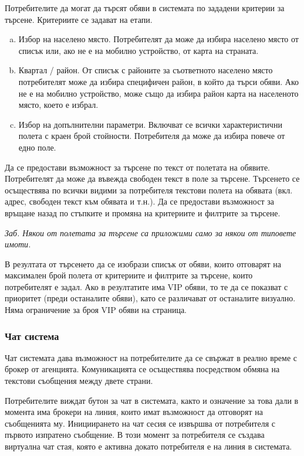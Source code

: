 \documentclass[a4paper]{article}
\begin{document}
Потребителите да могат да търсят обяви в системата по зададени критерии за търсене. Критериите се задават на етапи.
\begin{enumerate}[a) ]
\item Избор на населено място. Потребителят да може да избира населено място от списък  или, ако не е на мобилно устройство, от карта на страната. 
\item Квартал / район. От списък с районите за съответното населено място потребителят може да избира специфичен район, в който да търси обяви. Ако не е на мобилно устройство, може също да избира район карта на населеното място, което е избрал.
\item Избор на допълнителни параметри. Включват се всички характеристични полета с краен брой стойности. Потребителя да може да избира повече от едно поле.
\end{enumerate}

Да се предостави възможност за търсене по текст от полетата на обявите. Потребителят да може да въвежда свободен текст в поле за търсене. Търсенето се осъществява по всички видими за потребителя текстови полета на обявата (вкл. адрес, свободен текст към обявата и т.н.). Да се предостави възможност за връщане назад по стъпките и промяна на критериите и филтрите за търсене.

\emph{Заб. Някои от полетата за търсене са приложими само за някои от типовете имоти.}

В резултата от търсенето да се изобрази списък от обяви, които отговарят на максимален брой полета от критериите и филтрите за търсене, които потребителят е задал. Ако в резултатите има VIP обяви, то те да се показват с приоритет (преди останалите обяви), като се различават от останалите визуално. Няма ограничение за броя VIP обяви на страница.

\subsubsection{Чат система}

Чат системата дава възможност на потребителите да се свържат в реално време с брокер от агенцията. Комуникацията се осъществява посредством обмяна на текстови съобщения между двете страни. 

Потребителите виждат бутон за чат в системата, както и означение за това дали в момента има брокери на линия, които имат възможност да отговорят на съобщенията му. Инициирането на чат сесия се извършва от потребителя с първото изпратено съобщение. В този момент за потребителя се създава виртуална чат стая, която е активна докато потребителя е на линия в системата.
\end{document}
